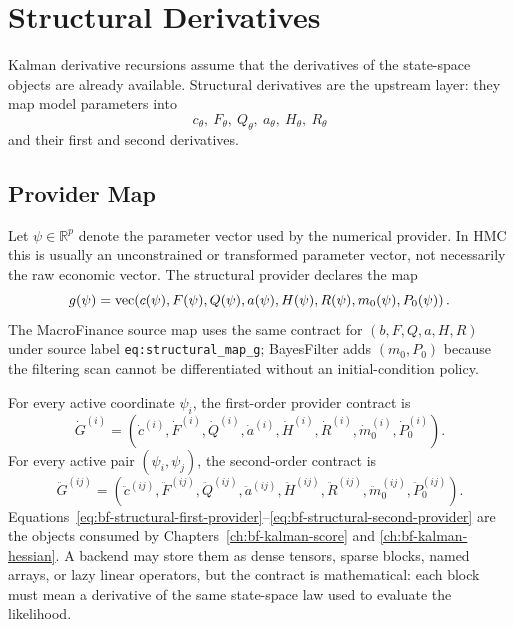 \chapter{Structural Derivatives}
\label{ch:bf-structural-derivatives}

Kalman derivative recursions assume that the derivatives of the state-space
objects are already available.  Structural derivatives are the upstream layer:
they map model parameters into
\[
  c_\theta,\ F_\theta,\ Q_\theta,\ a_\theta,\ H_\theta,\ R_\theta
\]
and their first and second derivatives.

\section{Provider Map}
\label{sec:bf-structural-provider-map}

Let $\psi\in\mathbb{R}^p$ denote the parameter vector used by the numerical
provider.  In HMC this is usually an unconstrained or transformed parameter
vector, not necessarily the raw economic vector.  The structural provider
declares the map
\begin{equation}
\label{eq:bf-structural-map}
  g(\psi)
  =
  \operatorname{vec}\!\left(
    c(\psi),F(\psi),Q(\psi),a(\psi),H(\psi),R(\psi),
    m_0(\psi),P_0(\psi)
  \right).
\end{equation}
The MacroFinance source map uses the same contract for
$(b,F,Q,a,H,R)$ under source label \texttt{eq:structural\_map\_g}; BayesFilter
adds $(m_0,P_0)$ because the filtering scan cannot be differentiated without an
initial-condition policy.

For every active coordinate $\psi_i$, the first-order provider contract is
\begin{equation}
\label{eq:bf-structural-first-provider}
  \dot G^{(i)}
  =
  \left(
    \dot c^{(i)},\dot F^{(i)},\dot Q^{(i)},
    \dot a^{(i)},\dot H^{(i)},\dot R^{(i)},
    \dot m_0^{(i)},\dot P_0^{(i)}
  \right).
\end{equation}
For every active pair $(\psi_i,\psi_j)$, the second-order contract is
\begin{equation}
\label{eq:bf-structural-second-provider}
  \ddot G^{(ij)}
  =
  \left(
    \ddot c^{(ij)},\ddot F^{(ij)},\ddot Q^{(ij)},
    \ddot a^{(ij)},\ddot H^{(ij)},\ddot R^{(ij)},
    \ddot m_0^{(ij)},\ddot P_0^{(ij)}
  \right).
\end{equation}
Equations~\eqref{eq:bf-structural-first-provider}--\eqref{eq:bf-structural-second-provider}
are the objects consumed by Chapters~\ref{ch:bf-kalman-score} and
\ref{ch:bf-kalman-hessian}.  A backend may store them as dense tensors, sparse
blocks, named arrays, or lazy linear operators, but the contract is mathematical:
each block must mean a derivative of the same state-space law used to evaluate
the likelihood.


